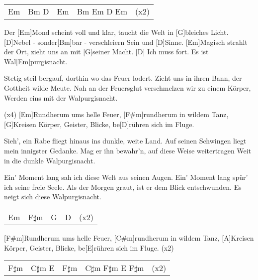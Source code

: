 

\begin{guitar}
	{\footnotesize\begin{tabular}{l|l|l|l|l}
			Em & Bm D & Em & Bm Em D Em & (x2)
	\end{tabular}}
	
	Der [Em]Mond scheint voll und klar, taucht die Welt in [G]bleiches Licht.
	[D]Nebel - sonder[Bm]bar - verschleiern Sein und [D]Sinne.
	[Em]Magisch strahlt der Ort, zieht uns an mit [G]seiner Macht.
	[D] Ich muss fort. Es ist Wal[Em]purgisnacht.
	
	
	Stetig steil bergauf, dorthin wo das Feuer lodert.
	Zieht uns in ihren Bann, der Gottheit wilde Meute.
	Nah an der Feuersglut verschmelzen wir zu einem Körper,
	Werden eins mit der Walpurgisnacht.
	
	 (x4)
	[Em]Rundherum ums helle Feuer, [F#m]rundherum in wildem Tanz,
	[G]Kreisen Körper, Geister, Blicke, be[D]rühren sich im Fluge.
	
	
	Sieh', ein Rabe fliegt hinaus ins dunkle, weite Land.
	Auf seinen Schwingen liegt mein innigster Gedanke.
	Mag er ihn bewahr'n, auf diese Weise weitertragen
	Weit in die dunkle Walpurgisnacht.
	
	
	Ein' Moment lang sah ich diese Welt aus seinen Augen.
	Ein' Moment lang spür' ich seine freie Seele.
	Als der Morgen graut, ist er dem Blick entschwunden.
	Es neigt sich diese Walpurgisnacht.
	
	 
	
	\pagebreak
	
	{\footnotesize\begin{tabular}{l|l|l|l|l}
			Em & F$\sharp$m & G & D & (x2)
	\end{tabular}}

	[F#m]Rundherum ums helle Feuer, [C#m]rundherum in wildem Tanz,
	[A]Kreisen Körper, Geister, Blicke, be[E]rühren sich im Fluge. (x2)
	
	{\footnotesize\begin{tabular}{l|l|l|l|l}
			F$\sharp$m & C$\sharp$m E & F$\sharp$m & C$\sharp$m F$\sharp$m E F$\sharp$m & (x2)
	\end{tabular}}
\end{guitar}